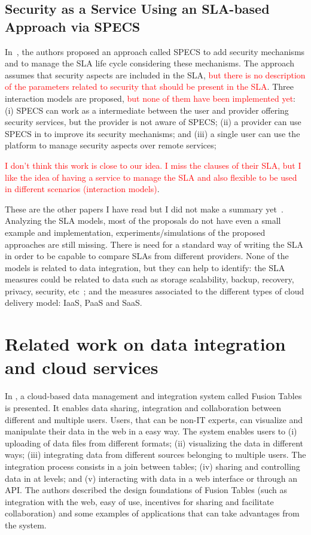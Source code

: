 \documentclass[12pt,a4paper,oneside]{article}
\begin{document}
\subsection{Security as a Service Using an SLA-based Approach via SPECS}

In~\cite{050}, the authors proposed an approach called SPECS to add security mechanisms and to manage the SLA life cycle considering these mechanisms. The approach assumes that  security aspects are included in the SLA, \textcolor{red}{but there is no description of the parameters related to security that should be present in the SLA}. Three interaction models are proposed, \textcolor{red}{but none of them have been implemented yet}: (i) SPECS can work as a intermediate between the user and provider offering security services, but the provider is not aware of SPECS; (ii) a provider can use SPECS in to improve its security mechanisms; and (iii) a single user can use the platform to manage security aspects over remote services; 

\textcolor{red}{I don't think this work is close to our idea. I miss the clauses of their SLA, but I like the idea of having a service to manage the SLA and also flexible to be used in different scenarios (interaction models)}.

\bigskip These are the other papers I have read but I did not make a summary yet~\cite{BernsmedJU11,025}.
Analyzing the SLA models, most of the proposals do not have even a small example and implementation, experiments/simulations of the proposed approaches are still missing. There is need for a standard way of writing the SLA in order to be capable to compare SLAs from different providers. None of the models is related to data integration, but they can help to identify: the SLA measures could be related to data such as storage scalability, backup, recovery, privacy, security, etc~\cite{005}; and the measures associated to the different types of cloud delivery model: IaaS, PaaS and SaaS.




\section{Related work on data integration and cloud services}

In \cite{Gonzalez:2010b}, a cloud-based data management and integration system called Fusion Tables is presented. It enables data sharing, integration and collaboration between different and multiple users. Users, that can be non-IT experts, can visualize and manipulate their data in the web in a easy way. The system enables users to (i) uploading of data files from different formats; (ii) visualizing the data in different ways; (iii) integrating data from different sources belonging to multiple users. The integration process consists in a join between tables; (iv) sharing and controlling data in at levels; and (v) interacting with data in a web interface or through an API. The authors described the design foundations of Fusion Tables (such as integration with the web, easy of use, incentives for sharing and facilitate collaboration) and some examples of applications that can take advantages from the system. 
\end{document}
